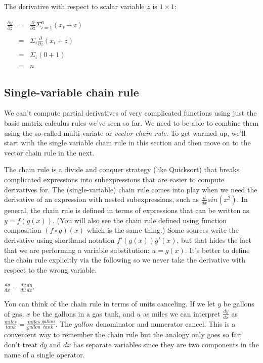 \documentclass[11pt]{article}
\begin{document}
The derivative with respect to scalar variable $z$ is $1 \times 1$:

$
\begin{array}{lcl}
\frac{\partial y}{\partial z} & = & \frac{\partial}{\partial z} \Sigma_{i=1}^n (x_i+z)\\\\
& = & \Sigma_i \frac{\partial}{\partial z} (x_i+z)\\\\
& = & \Sigma_i (0 + 1)\\\\
& = & n
\end{array}
$

\subsection{Single-variable chain rule}


We can't compute partial derivatives of very complicated functions using just the basic matrix calculus rules we've seen so far. We need to be able to combine them using the so-called multi-variate or {\em vector chain rule}. To get warmed up, we'll start with the single variable chain rule in this section and then move on to the vector chain rule in the next.

The chain rule is a divide and conquer strategy (like Quicksort) that breaks complicated expressions into subexpressions that are easier to compute derivatives for.  The (single-variable) chain rule comes into play when we need the derivative of an expression with nested subexpressions, such as $\frac{d}{dx} sin(x^2)$.  In general, the chain rule is defined in terms of expressions that can be written as $y = f(g(x))$. (You will also see the chain rule defined using function composition $(f \circ g)(x)$ which is the same thing.)  Some sources write the derivative using shorthand notation $f'(g(x))g'(x)$, but that hides the fact that we are performing a variable substitution: $u = g(x)$. It's better to define the chain rule explicitly via the following so we never take the derivative with respect to the wrong variable.

$\frac{dy}{dx} = \frac{dy}{du} \frac{du}{dx}$.

You can think of the chain rule in terms of units canceling. If we let $y$ be gallons of gas, $x$ be the gallons in a gas tank, and $u$ as miles we can interpret $\frac{dy}{dx}$ as $\frac{miles}{tank} = \frac{miles}{gallon} \frac{gallon}{tank}$. The $gallon$ denominator and numerator cancel. This is a convenient way to remember the chain rule but the analogy only goes so far; don't treat $dy$ and $dx$ has separate variables since they are two components in the name of a single operator.
\end{document}
